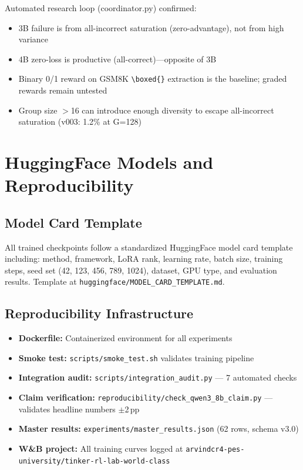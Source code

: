 \documentclass[12pt,a4paper]{report}
\theoremstyle{definition}
\begin{document}
Automated research loop (coordinator.py) confirmed:
\begin{itemize}[nosep]
\item 3B failure is from all-incorrect saturation (zero-advantage), not from high variance
\item 4B zero-loss is productive (all-correct)---opposite of 3B
\item Binary 0/1 reward on GSM8K \texttt{\textbackslash boxed\{\}} extraction is the baseline; graded rewards remain untested
\item Group size $>$16 can introduce enough diversity to escape all-incorrect saturation (v003: 1.2\% at G=128)
\end{itemize}




\chapter{HuggingFace Models and Reproducibility}
\label{ch:hf-repro}

\section{Model Card Template}
\label{sec:model-card}

All trained checkpoints follow a standardized HuggingFace model card template including:
method, framework, LoRA rank, learning rate, batch size, training steps, seed set (42, 123, 456, 789, 1024),
dataset, GPU type, and evaluation results. Template at \texttt{huggingface/MODEL\_CARD\_TEMPLATE.md}.

\section{Reproducibility Infrastructure}
\label{sec:repro-infra}

\begin{itemize}[nosep]
\item \textbf{Dockerfile:} Containerized environment for all experiments
\item \textbf{Smoke test:} \texttt{scripts/smoke\_test.sh} validates training pipeline
\item \textbf{Integration audit:} \texttt{scripts/integration\_audit.py} --- 7 automated checks
\item \textbf{Claim verification:} \texttt{reproducibility/check\_qwen3\_8b\_claim.py} --- validates headline numbers $\pm$2\,pp
\item \textbf{Master results:} \texttt{experiments/master\_results.json} (62 rows, schema v3.0)
\item \textbf{W\&B project:} All training curves logged at \texttt{arvindcr4-pes-university/tinker-rl-lab-world-class}
\end{itemize}
\end{document}
